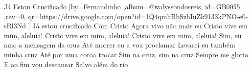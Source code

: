 \beginsong
{Já Estou Crucificado %
}[by={Fernandinho %
},album={@walyssondosreis},
id={GB0055 %
},rev={0}, %
qr={https://drive.google.com/open?id=1Q4qmhBbSzhIuZk9133kPNO-e0-sRl3Nd %
}]
\beginverse*
Já estou crucificado
Com Cristo
Agora vivo não mais eu
\endverse
\beginchorus
Cristo vive em mim, aleluia!
Cristo vive em mim, aleluia!
Cristo vive em mim, aleluia!
\endchorus
\beginverse*
Sim, eu amo a mensagem da cruz
Até morrer eu a vou proclamar
Levarei eu também minha cruz
Até por uma coroa trocar
\endverse
\beginverse*
Sim na cruz, sim na cruz
Sempre me glorio
E ao fim vou descansar
Salvo além do rio
\endverse

